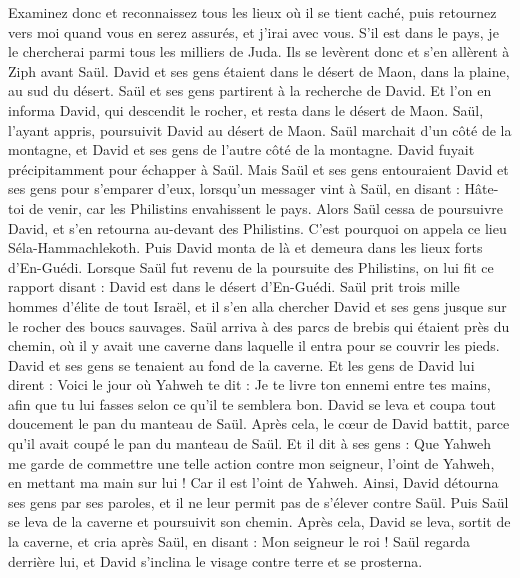 \begin{multicols}{2}
Examinez donc et reconnaissez tous les lieux où il se tient caché, puis retournez vers moi quand vous en serez assurés, et j'irai avec vous. S'il est dans le pays, je le chercherai parmi tous les milliers de Juda.
Ils se levèrent donc et s'en allèrent à Ziph avant Saül. David et ses gens étaient dans le désert de Maon, dans la plaine, au sud du désert.
Saül et ses gens partirent à la recherche de David. Et l'on en informa David, qui descendit le rocher, et resta dans le désert de Maon. Saül, l'ayant appris, poursuivit David au désert de Maon.
Saül marchait d'un côté de la montagne, et David et ses gens de l'autre côté de la montagne. David fuyait précipitamment pour échapper à Saül. Mais Saül et ses gens entouraient David et ses gens pour s'emparer d'eux,
lorsqu'un messager vint à Saül, en disant : Hâte-toi de venir, car les Philistins envahissent le pays.
Alors Saül cessa de poursuivre David, et s'en retourna au-devant des Philistins. C'est pourquoi on appela ce lieu Séla-Hammachlekoth.
\VerseOne{}Puis David monta de là et demeura dans les lieux forts d'En-Guédi.
Lorsque Saül fut revenu de la poursuite des Philistins, on lui fit ce rapport disant : David est dans le désert d'En-Guédi.
Saül prit trois mille hommes d'élite de tout Israël, et il s'en alla chercher David et ses gens jusque sur le rocher des boucs sauvages.
Saül arriva à des parcs de brebis qui étaient près du chemin, où il y avait une caverne dans laquelle il entra pour se couvrir les pieds. David et ses gens se tenaient au fond de la caverne.
Et les gens de David lui dirent : Voici le jour où Yahweh te dit : Je te livre ton ennemi entre tes mains, afin que tu lui fasses selon ce qu'il te semblera bon. David se leva et coupa tout doucement le pan du manteau de Saül.
Après cela, le cœur de David battit, parce qu'il avait coupé le pan du manteau de Saül.
Et il dit à ses gens : Que Yahweh me garde de commettre une telle action contre mon seigneur, l'oint de Yahweh, en mettant ma main sur lui ! Car il est l'oint de Yahweh.
Ainsi, David détourna ses gens par ses paroles, et il ne leur permit pas de s'élever contre Saül. Puis Saül se leva de la caverne et poursuivit son chemin.
Après cela, David se leva, sortit de la caverne, et cria après Saül, en disant : Mon seigneur le roi ! Saül regarda derrière lui, et David s'inclina le visage contre terre et se prosterna.

\end{multicols}
